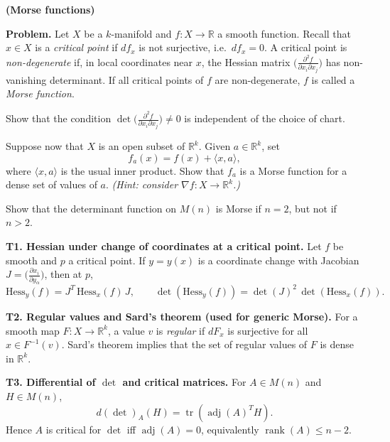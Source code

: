 \begin{problem}[CP-I-0114]
\label{prob:cp-i-0114}
\textbf{(Morse functions)}

\hspace*{1.5em}\textbf{Problem.}
	Let $X$ be a $k$-manifold and $f:X\to\mathbb{R}$ a smooth function.
	Recall that $x\in X$ is a \emph{critical point} if $df_x$ is not surjective, i.e.\ $df_x=0$.
	A critical point is \emph{non-degenerate} if, in local coordinates near $x$, the Hessian matrix
	$\big(\frac{\partial^2 f}{\partial x_i\partial x_j}\big)$ has non-vanishing determinant.
	If all critical points of $f$ are non-degenerate, $f$ is called a \emph{Morse function}.

		\par\noindent\textbullet\quad Show that the condition $\det\!\big(\frac{\partial^2 f}{\partial x_i\partial x_j}\big)\neq 0$
		is independent of the choice of chart.
		\par\noindent\textbullet\quad Suppose now that $X$ is an open subset of $\mathbb{R}^k$. Given $a\in\mathbb{R}^k$, set
		\[
		f_a(x)=f(x)+\langle x,a\rangle,
		\]
		where $\langle x,a\rangle$ is the usual inner product. Show that $f_a$ is a Morse function for a dense set
		of values of $a$. \emph{(Hint: consider $\nabla f:X\to\mathbb{R}^k$.)}
		\par\noindent\textbullet\quad Show that the determinant function on $M(n)$ is Morse if $n=2$, but not if $n>2$.

	\medskip

	\noindent\textbf{T1. Hessian under change of coordinates at a critical point.}
	Let $f$ be smooth and $p$ a critical point. If $y=y(x)$ is a coordinate change with Jacobian
	$J=\big(\frac{\partial x_i}{\partial y_\alpha}\big)$, then at $p$,
	\[
	\mathrm{Hess}_y(f)=J^T\,\mathrm{Hess}_x(f)\,J,
	\qquad
	\det(\mathrm{Hess}_y(f))=\det(J)^2\,\det(\mathrm{Hess}_x(f)).
	\]

	\medskip
	\noindent\textbf{T2. Regular values and Sard's theorem (used for generic Morse).}
	For a smooth map $F:X\to\mathbb{R}^k$, a value $v$ is \emph{regular} if $dF_x$ is surjective for all $x\in F^{-1}(v)$.
	Sard's theorem implies that the set of regular values of $F$ is dense in $\mathbb{R}^k$.

	\medskip
	\noindent\textbf{T3. Differential of $\det$ and critical matrices.}
	For $A\in M(n)$ and $H\in M(n)$,
	\[
	d(\det)_A(H)=\operatorname{tr}(\operatorname{adj}(A)^T H).
	\]
	Hence $A$ is critical for $\det$ iff $\operatorname{adj}(A)=0$, equivalently $\operatorname{rank}(A)\le n-2$.

	\medskip
\end{problem}

